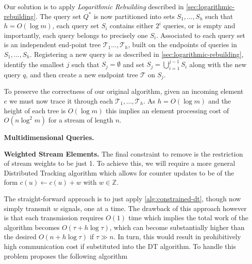 Our solution is to apply \textit{Logarithmic Rebuilding} described in \cref{sec:logarithmic-rebuilding}. The query set $Q^*$ is now partitioned into sets $S_1,\dots, S_h$ such that $h = O(\log m)$, each query set $S_i$ contains either $2^i$ queries, or is empty and importantly, each query belongs to precisely one $S_i$. Associated to each query set is an independent end-point tree $\mathcal{T}_1\dots, \mathcal{T}_h$, built on the endpoints of queries in $S_1,\dots,S_h$. Registering a new query is as described in \cref{sec:logarithmic-rebuilding}, identify the smallest $j$ such that $S_j = \emptyset$ and set $S_j = \bigcup_{i=1}^{j-1}S_i$ along with the new query $q$, and then create a new endpoint tree $\mathcal{T}$ on $S_j$.


To preserve the correctness of our original algorithm, given an incoming element $e$ we must now trace it through each $\mathcal{T}_1,\dots,\mathcal{T}_h$. As $h = O(\log m)$ and the height of each tree is $O(\log m)$ this implies an element processing cost of $O(n\log ^2 m)$ for a stream of length $n$.

\textbf{Multidimensional Queries.} 

\textbf{Weighted Stream Elements.} The final constraint to remove is the restriction of stream weights to be just 1. To achieve this, we will require a more general Distributed Tracking algorithm which allows for counter updates to be of the form $c(u) \gets c(u) + w$ with $w\in\mathbb{Z}$. 

The straight-forward approach is to just apply \cref{alg:constrained-dt}, though now simply transmit $w$ signals, one at a time. The drawback of this approach however is that each transmission requires $O(1)$ time which implies the total work of the algorithm becomes $O(\tau + h\log\tau)$, which can become substantially higher than the desired $O(n + h\log\tau)$ if $\tau\gg n$. In turn, this would result in prohibitively high communication cost if substituted into the DT algorithm. To handle this problem \cite{GAN16} proposes the following algorithm


